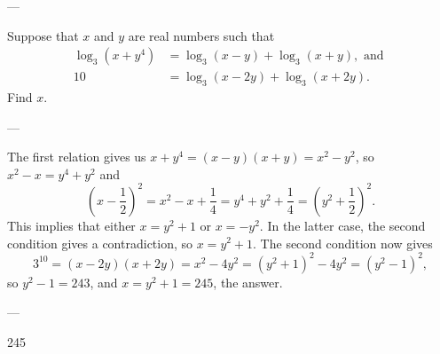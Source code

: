 
---

Suppose that $x$ and $y$ are real numbers such that
\begin{align*}
    \log_3(x+y^4)&=\log_3(x-y)+\log_3(x+y),\text{ and }\\
    10&=\log_3(x-2y)+\log_3(x+2y).
\end{align*}
Find $x$.

---

The first relation gives us $x+y^4=(x-y)(x+y)=x^2-y^2$, so $x^2-x=y^4+y^2$ and \[\left(x-\frac12\right)^2=x^2-x+\frac14=y^4+y^2+\frac14=\left(y^2+\frac12\right)^2.\]
This implies that either $x=y^2+1$ or $x=-y^2$. In the latter case, the second condition gives a contradiction, so $x=y^2+1$. The second condition now gives \[3^{10}=(x-2y)(x+2y)=x^2-4y^2=(y^2+1)^2-4y^2=(y^2-1)^2,\]so $y^2-1=243$, and $x=y^2+1=245$, the answer.

---

245


